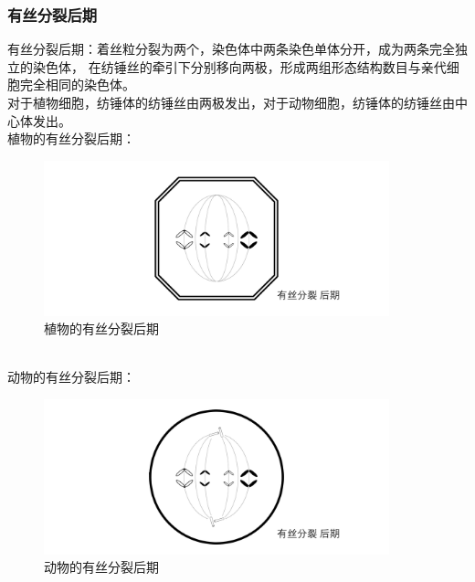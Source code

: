\documentclass[UTF8]{ctexart}
\begin{document}
\subsubsection{有丝分裂后期}
    有丝分裂后期：着丝粒分裂为两个，染色体中两条染色单体分开，成为两条完全独立的染色体，
    在纺锤丝的牵引下分别移向两极，形成两组形态结构数目与亲代细胞完全相同的染色体。\\[3mm]
    对于植物细胞，纺锤体的纺锤丝由两极发出，对于动物细胞，纺锤体的纺锤丝由中心体发出。\\[6mm]
    植物的有丝分裂后期：
    \begin{figure}[h]
        \begin{center}
            \includegraphics[width=10cm]{BiologyImage/27.jpg}
            \caption{植物的有丝分裂后期}
        \end{center}
    \end{figure}\\
    动物的有丝分裂后期：
    \begin{figure}[h]
        \begin{center}
            \includegraphics[width=10cm]{BiologyImage/32.jpg}
            \caption{动物的有丝分裂后期}
        \end{center}
    \end{figure}\\

\newpage
\end{document}
